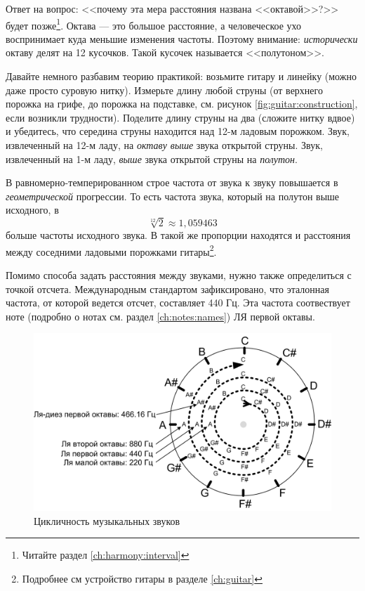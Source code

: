 Ответ на вопрос: <<почему эта мера расстояния названа <<октавой>>?>> будет позже\footnote{Читайте раздел \ref{ch:harmony:interval}}. Октава --- это большое расстояние, а человеческое ухо воспринимает куда меньшие изменения частоты. Поэтому внимание: \emph{исторически} октаву делят на 12 кусочков. Такой кусочек называется <<полутоном>>.

\begin{Example}
    Давайте немного разбавим теорию практикой: возьмите гитару и линейку (можно даже просто суровую нитку). Измерьте длину любой струны (от верхнего порожка на грифе, до порожка на подставке, см. рисунок \ref{fig:guitar:construction}, если возникли трудности). Поделите длину струны на два (сложите нитку вдвое) и убедитесь, что середина струны находится над 12-м ладовым порожком. Звук, извлеченный на 12-м ладу, на \emph{октаву выше} звука открытой струны. Звук, извлеченный на 1-м ладу, \emph{выше} звука открытой струны на \emph{полутон}.
\end{Example}

В равномерно-темперированном строе частота от звука к звуку повышается в \emph{геометрической} прогрессии. То есть частота звука, который на полутон выше исходного, в \[\sqrt[12]{2}\approx 1,059463\] больше частоты исходного звука. В такой же пропорции находятся и расстояния между соседними ладовыми порожками гитары\footnote{Подробнее см устройство гитары в разделе \ref{ch:guitar}}.

Помимо способа задать расстояния между звуками, нужно также определиться с точкой отсчета. Международным стандартом зафиксировано, что эталонная частота, от которой ведется отсчет, составляет 440 Гц. Эта частота соотвествует ноте (подробно о нотах см. раздел \ref{ch:notes:names}) ЛЯ первой октавы. 

\begin{figure}[!ht]
    \centering
    \includegraphics{fig/intervals/octave-spiral} 
    \caption{Цикличность музыкальных звуков}\label{fig:music:tone:octave}
\end{figure} 

